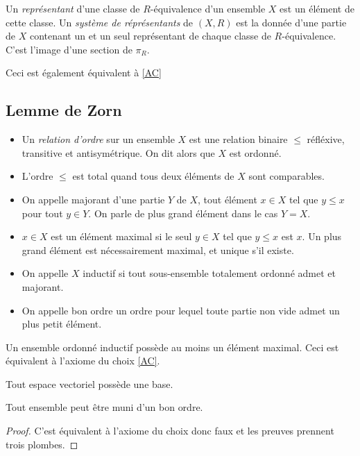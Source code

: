 \documentclass{cours}
\begin{document}
\begin{definition}
    Un \emph{représentant} d'une classe de $R$-équivalence d'un ensemble $X$ est un élément de cette classe. Un \emph{système de réprésentants} de $\left(X, R\right)$ est la donnée d'une partie de $X$ contenant un et un seul représentant de chaque classe de $R$-équivalence. C'est l'image d'une section de $\pi_{R}$.
\end{definition}
\begin{remark}
    Ceci est également équivalent à \ref{AC}
\end{remark}

\subsection{Lemme de Zorn}
\begin{definition}
    \begin{itemize}
        \item Un \emph{relation d'ordre} sur un ensemble $X$ est une relation binaire $\leq$ réfléxive, transitive et antisymétrique. On dit alors que $X$ est ordonné.
        \item L'ordre $\leq$ est total quand tous deux éléments de $X$ sont comparables. 
        \item On appelle majorant d'une partie $Y$ de $X$, tout élément $x \in X$ tel que $y \leq x$ pour tout $y \in Y$. On parle de plus grand élément dans le cas $Y = X$.
        \item $x \in X$ est un élément maximal si le seul $y \in X$ tel que $y \leq x$ est $x$. Un plus grand élément est nécessairement maximal, et unique s'il existe.
        \item On appelle $X$ inductif si tout sous-ensemble totalement ordonné admet et majorant.
        \item On appelle bon ordre un ordre pour lequel toute partie non vide admet un plus petit élément.
    \end{itemize}
\end{definition}

\begin{theorem}\label{Zorn}
    Un ensemble ordonné inductif possède au moins un élément maximal. Ceci est équivalent à l'axiome du choix \ref{AC}.
\end{theorem}
\begin{corollary}
    Tout espace vectoriel possède une base.
\end{corollary}
\begin{corollary}\label{Zermelo}
    Tout ensemble peut être muni d'un bon ordre.
\end{corollary}
\begin{proof}
    C'est équivalent à l'axiome du choix donc faux et les preuves prennent trois plombes.
\end{proof}
\end{document}
